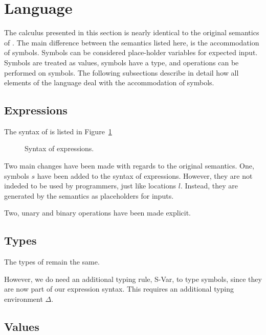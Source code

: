 

\section{Language}
\label{sec:language}

The calculus presented in this section is nearly identical to the original semantics of \TOPHAT.
The main difference between the semantics listed here, is the accommodation of symbols.
Symbols can be considered place-holder variables for expected input.
Symbols are treated as values, symbols have a type, and operations can be performed on symbols.
The following subsections describe in detail how all elements of the \TOPHAT language deal with the accommodation of symbols.


\subsection{Expressions}
\label{expressions}

The syntax of \TOPHAT is listed in Figure~\ref{syntaxtophat}

\begin{figure}

\label{syntaxtophat}

\caption{Syntax of \TOPHAT expressions.}
\end{figure}

Two main changes have been made with regards to the original \TOPHAT semantics.
One, symbols $s$ have been added to the syntax of expressions.
However, they are not indeded to be used by programmers, just like locations $l$.
Instead, they are generated by the semantics as placeholders for inputs.

Two, unary and binary operations have been made explicit.

\subsection{Types}

The types of \TOPHAT remain the same.


However, we do need an additional typing rule, S-Var, to type symbols,
since they are now part of our expression syntax.
This requires an additional typing environment $\Delta$.


\subsection{Values}

